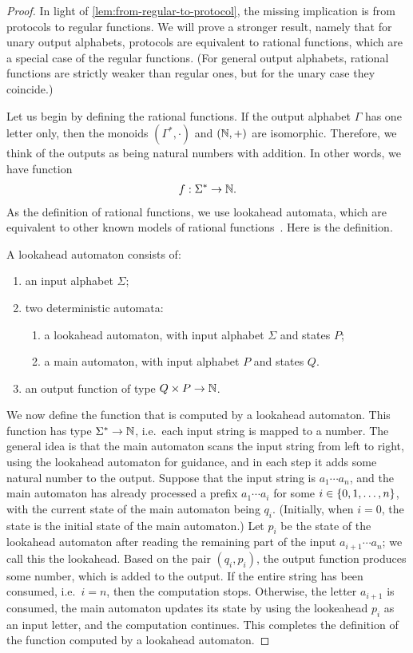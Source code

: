 \begin{proof}
  In light of \cref{lem:from-regular-to-protocol}, the missing implication is from protocols to regular functions. We will prove a stronger result, namely that for unary output alphabets, protocols are equivalent to rational functions, which are a special case of the regular functions. (For general output alphabets, rational functions are strictly weaker than regular ones, but for the unary case they coincide.) 

  Let us begin by defining the rational functions. If the output alphabet $\Gamma$ has one letter only, then the monoids $(\Gamma^*, \cdot)$ and $({\mathbb N},+)$ are isomorphic. Therefore, we think of the outputs as being natural numbers with addition. In other words, we have function 
\begin{align*}
f : \Sigma^* \to {\mathbb N}.
\end{align*}
As the definition of rational functions, we use lookahead automata, which are equivalent to other known models of rational functions~\cite[Theorem 14.1]{bojanczyk_automata_2025}. Here is the definition.

\begin{definition}\label{def:bimachine}
  A lookahead automaton consists of:
  \begin{enumerate}
    \item an input alphabet $\Sigma$;
    \item two deterministic automata: 
    \begin{enumerate}
      \item a lookahead automaton, with input alphabet $\Sigma$ and states $P$;
      \item a main automaton, with input alphabet $P$ and states $Q$.
    \end{enumerate}
    \item an output function of type $Q \times P \to {\mathbb N}$. 
  \end{enumerate}
\end{definition}
We now define the function that is computed by a lookahead automaton. This function has type  $\Sigma^* \to {\mathbb N}$, i.e.~each input string is mapped to a number. The general idea is that the main automaton scans the input string from left to right, using the lookahead automaton for guidance, and in each step it adds some natural number to the output.  Suppose that the input string is $a_1 \cdots a_n$, and the main automaton has already processed a prefix $a_1 \cdots a_i$ for some $i \in \{0,1,\ldots,n\}$, with the current state of the main automaton  being $q_i$. (Initially, when $i=0$, the state is the initial state of the main automaton.) Let $p_i$ be the state of the lookahead automaton after reading the remaining part of the input $a_{i+1} \cdots a_n$; we call this the lookahead. Based on the pair $(q_i,p_i)$, the output function produces some number, which is added to the output. If the entire string has been consumed, i.e.~$i=n$, then the computation stops. Otherwise, the letter $a_{i+1}$ is consumed, the main automaton updates its state by using the lookeahead $p_i$ as an input letter, and the computation continues.  This completes the definition of the function computed by a lookahead automaton. 


\end{proof}

